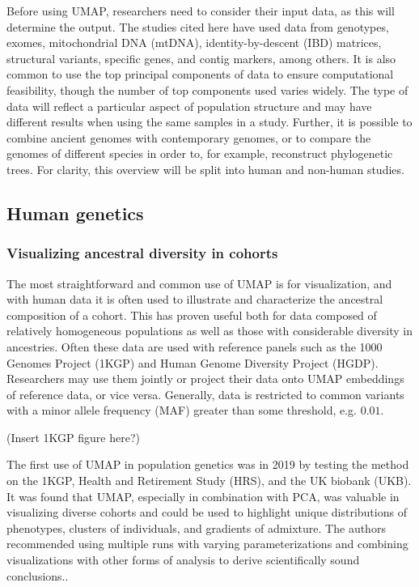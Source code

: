 \documentclass[12pt]{article}
\begin{document}
Before using UMAP, researchers need to consider their input data, as this will determine the output. The studies cited here have used data from genotypes, exomes, mitochondrial DNA (mtDNA), identity-by-descent (IBD) matrices, structural variants, specific genes, and contig markers, among others. It is also common to use the top principal components of data to ensure computational feasibility, though the number of top components used varies widely. The type of data will reflect a particular aspect of population structure and may have different results when using the same samples in a study. Further, it is possible to combine ancient genomes with contemporary genomes, or to compare the genomes of different species in order to, for example, reconstruct phylogenetic trees. For clarity, this overview will be split into human and non-human studies.

\subsection*{Human genetics}
\subsubsection*{Visualizing ancestral diversity in cohorts}
The most straightforward and common use of UMAP is for visualization, and with human data it is often used to illustrate and characterize the ancestral composition of a cohort. This has proven useful both for data composed of relatively homogeneous populations as well as those with considerable diversity in ancestries. Often these data are used with reference panels such as the 1000 Genomes Project (1KGP)\cite{10002015global} and Human Genome Diversity Project (HGDP)\cite{cann2002human}. Researchers may use them jointly or project their data onto UMAP embeddings of reference data, or vice versa. Generally, data is restricted to common variants with a minor allele frequency (MAF) greater than some threshold, e.g. $0.01$.

(Insert 1KGP figure here?)

The first use of UMAP in population genetics was in 2019 by testing the method on the 1KGP, Health and Retirement Study (HRS)\cite{juster1995overview}, and the UK biobank (UKB)\cite{sudlow2015uk}. It was found that UMAP, especially in combination with PCA, was valuable in visualizing diverse cohorts and could be used to highlight unique distributions of phenotypes, clusters of individuals, and gradients of admixture. The authors recommended using multiple runs with varying parameterizations and combining visualizations with other forms of analysis to derive scientifically sound conclusions\cite{diaz-papkovich_umap_2019}..
\end{document}
